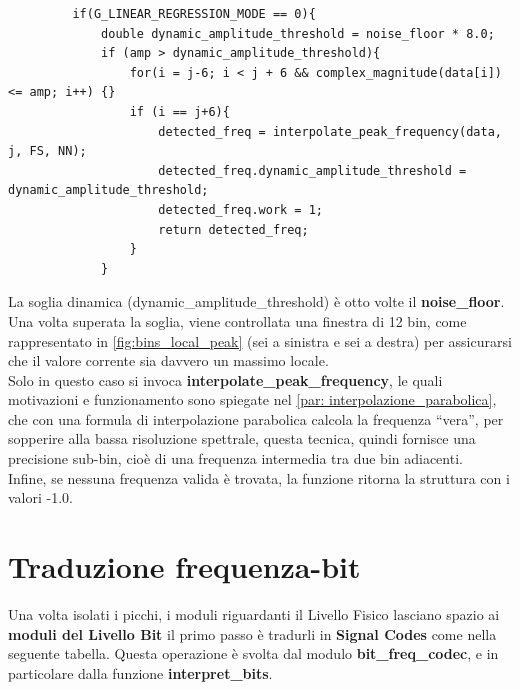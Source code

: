  \begin{verbatim}
         if(G_LINEAR_REGRESSION_MODE == 0){
             double dynamic_amplitude_threshold = noise_floor * 8.0;
             if (amp > dynamic_amplitude_threshold){
                 for(i = j-6; i < j + 6 && complex_magnitude(data[i]) <= amp; i++) {}
                 if (i == j+6){
                     detected_freq = interpolate_peak_frequency(data, j, FS, NN);
                     detected_freq.dynamic_amplitude_threshold = dynamic_amplitude_threshold;
                     detected_freq.work = 1;
                     return detected_freq;
                 }
             }
 \end{verbatim}
 
La soglia dinamica (dynamic\_amplitude\_threshold) è otto volte il \textbf{noise\_floor}.
 Una volta superata la soglia, viene controllata una finestra di 12 bin, come rappresentato in \autoref{fig:bins_local_peak} (sei a sinistra e sei a destra) 
 per assicurarsi che il valore corrente sia davvero un massimo locale. \\
Solo in questo caso si invoca \textbf{interpolate\_peak\_frequency}, le quali motivazioni e funzionamento sono spiegate nel \autoref{par: interpolazione_parabolica},
 che con una formula di interpolazione parabolica calcola la frequenza “vera”, 
per sopperire alla bassa risoluzione spettrale, questa tecnica, quindi fornisce una precisione sub-bin, cioè di una frequenza intermedia tra due bin adiacenti.\\  

 
 Infine, se nessuna frequenza valida è trovata, la funzione ritorna la struttura con i valori -1.0.  
 
 \section{Traduzione frequenza-bit}
 
 Una volta isolati i picchi, i moduli riguardanti il Livello Fisico lasciano spazio ai \textbf{moduli del Livello Bit} il primo passo è tradurli in 
 \textbf{Signal Codes} come nella seguente tabella.
  Questa operazione è svolta dal modulo \textbf{bit\_freq\_codec}, e in particolare dalla funzione \textbf{interpret\_bits}.  




